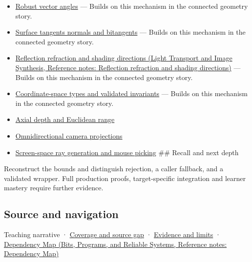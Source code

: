 \begin{itemize}
\item
  \hyperref[appendix-e569e60e18e6]{Robust vector angles} --- Builds on this mechanism in the connected geometry story.
\item
  \hyperref[appendix-e31893dec985]{Surface tangents normals and bitangents} --- Builds on this mechanism in the connected geometry story.
\item
  \href{../04-Light-Transport-and-Image-Synthesis/main.pdf\#nameddest=appendix-44e00863b4d5}{Reflection refraction and shading directions (Light Transport and Image Synthesis, Reference notes: Reflection refraction and shading directions)} --- Builds on this mechanism in the connected geometry story.
\item
  \hyperref[appendix-380a220e2529]{Coordinate-space types and validated invariants} --- Builds on this mechanism in the connected geometry story.
\item
  \hyperref[appendix-cac01ebeeb11]{Axial depth and Euclidean range}
\item
  \hyperref[appendix-fc99ad39f351]{Omnidirectional camera projections}
\item
  \hyperref[appendix-f1a6d43e80d1]{Screen-space ray generation and mouse picking} \#\# Recall and next depth
\end{itemize}

Reconstruct the bounds and distinguish rejection, a caller fallback, and a validated wrapper. Full production proofs, target-specific integration and learner mastery require further evidence.

\subsection{Source and navigation}\label{appendix-f744e41b95b4-source-and-navigation}

{Teaching narrative} · \hyperref[appendix-fd090d982a15-phase-6---parts-501-600]{Coverage and source gap} · \hyperref[appendix-a103e7846d21-phase-6---source-analysis-and-verification]{Evidence and limits} · \href{../01-Bits-Programs-and-Reliable-Systems/main.pdf\#nameddest=appendix-4ad47bdd269a}{Dependency Map (Bits, Programs, and Reliable Systems, Reference notes: Dependency Map)}
